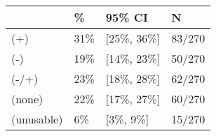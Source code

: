 \begin{tabular}{llll}
\hline
& \% & 95\% CI  & N \\
\hline
(+) & 31\% & [25\%, 36\%] & 83/270\\
(-) & 19\% & [14\%, 23\%] & 50/270\\
(-/+) & 23\% & [18\%, 28\%] & 62/270\\
(none) & 22\% & [17\%, 27\%] & 60/270\\
(unusable) & 6\% & [3\%, 9\%] & 15/270\\
\hline
\end{tabular}
